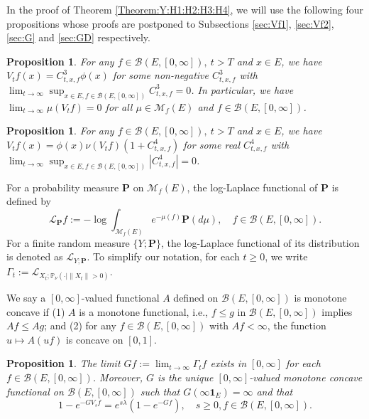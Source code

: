 \documentclass[12pt,a4paper]{amsart}
\numberwithin{equation}{section}
\theoremstyle{plain}
\newtheorem{prop}[thm]{Proposition}
\theoremstyle{definition}
\theoremstyle{remark}
\begin{document}
	In the  proof of Theorem \ref{Theorem:Y:H1:H2:H3:H4}, we will use the following four propositions whose proofs are postponed to Subsections \ref{sec:Vf1}, \ref{sec:Vf2}, \ref{sec:G} and \ref{sec:GD} respectively.

\begin{prop} \label{prop:Vf1::H1:H2::Y}
	For any $f\in \mathcal B(E, [0,\infty]),~t > T$ and $x\in E$, we have $V_tf(x) = C^3_{t,x,f} \phi(x)$ for some non-negative $C^3_{t,x,f}$ with $\lim_{t\to \infty} \sup_{x\in E, f\in \mathcal B(E, [0,\infty])}  C^3_{t,x,f} = 0$.
	In particular, we have $\lim_{t\to \infty} \mu(V_tf)= 0 $ for all $\mu \in \mathcal M_f(E)$ and $f\in \mathcal B(E,[0,\infty])$.
\end{prop}

\begin{prop} \label{prop:Vf2}
	For any $f\in \mathcal B(E,[0,\infty]),~t>T$ and $x\in E$, we have $V_tf(x) = \phi(x) \nu (V_tf) (1+C^4_{t,x,f}) $ for some real $C^4_{t,x,f}$ with $\lim_{t\to \infty} \sup_{x\in E, f\in \mathcal B(E, [0,\infty])} |C^4_{t,x,f}| = 0$.
\end{prop}

	For a probability measure $\mathbf P$ on $\mathcal M_f(E)$,
    the log-Laplace functional of $\mathbf P$ is defined by
	\[
	\mathscr L_\mathbf P f := - \log \int_{\mathcal M_f(E)}  e^{-\mu(f)} \mathbf P(d\mu), \quad
	f\in \mathcal B(E,[0,\infty]).
	\]
	For a finite random measure $\{Y; \mathbf P\}$, the log-Laplace functional of its distribution is denoted as $\mathscr L_{Y;\mathbf P}$.
	To simplify our notation, for each $t\geq 0$, we write
	$\Gamma_t := \mathscr L_{X_t;\mathbb P_\nu(\cdot | \|X_t\|>0)}$.
	
	We say a $[0,\infty]$-valued functional $A$ defined on $\mathcal B(E,[0,\infty])$ is monotone concave if
	(1) $A$ is a monotone functional, i.e., $f\leq g$ in $\mathcal B(E,[0,\infty])$ implies $Af \leq Ag$; and
	(2) for any $f\in \mathcal B(E,[0,\infty])$ with $Af< \infty$, the function $u \mapsto A(uf)$ is concave on $[0,1]$.

\begin{prop} \label{prop:G}
	The limit $Gf:= \lim_{t\to \infty} \Gamma_t f$ exists in $[0,\infty]$ for each $f\in \mathcal B(E,[0,\infty])$.
	Moreover, $G$ is the unique $[0,\infty]$-valued monotone concave functional on $\mathcal B(E,[0,\infty])$ such that
	$G(\infty  \mathbf 1_E) = \infty$ and that
\begin{equation} \label{eq:G.0}
	1 - e^{- GV_s f}
	= e^{s\lambda} (1 - e^{-Gf}),
	\quad s\geq 0, f\in \mathcal B(E,[0,\infty]).
\end{equation}
\end{prop}
\end{document}
